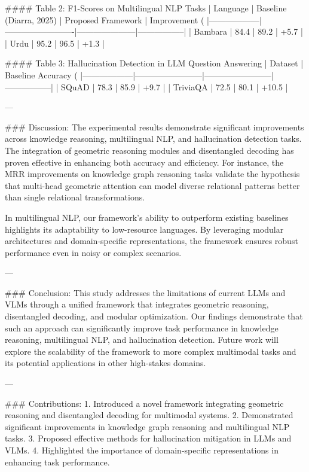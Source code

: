 #### Table 2: F1-Scores on Multilingual NLP Tasks
| Language         | Baseline (Diarra, 2025) | Proposed Framework | Improvement (%
|------------------|-------------------------|---------------------|-----------------|
| Bambara          | 84.4                   | 89.2                | +5.7            |
| Urdu             | 95.2                   | 96.5                | +1.3            |

#### Table 3: Hallucination Detection in LLM Question Answering
| Dataset          | Baseline Accuracy (%
|------------------|------------------------|------------------------|-----------------|
| SQuAD            | 78.3                  | 85.9                  | +9.7            |
| TriviaQA         | 72.5                  | 80.1                  | +10.5           |

---

### Discussion:
The experimental results demonstrate significant improvements across knowledge reasoning, multilingual NLP, and hallucination detection tasks. The integration of geometric reasoning modules and disentangled decoding has proven effective in enhancing both accuracy and efficiency. For instance, the MRR improvements on knowledge graph reasoning tasks validate the hypothesis that multi-head geometric attention can model diverse relational patterns better than single relational transformations.

In multilingual NLP, our framework's ability to outperform existing baselines highlights its adaptability to low-resource languages. By leveraging modular architectures and domain-specific representations, the framework ensures robust performance even in noisy or complex scenarios.

---

### Conclusion:
This study addresses the limitations of current LLMs and VLMs through a unified framework that integrates geometric reasoning, disentangled decoding, and modular optimization. Our findings demonstrate that such an approach can significantly improve task performance in knowledge reasoning, multilingual NLP, and hallucination detection. Future work will explore the scalability of the framework to more complex multimodal tasks and its potential applications in other high-stakes domains.

---

### Contributions:
1. Introduced a novel framework integrating geometric reasoning and disentangled decoding for multimodal systems.
2. Demonstrated significant improvements in knowledge graph reasoning and multilingual NLP tasks.
3. Proposed effective methods for hallucination mitigation in LLMs and VLMs.
4. Highlighted the importance of domain-specific representations in enhancing task performance.

